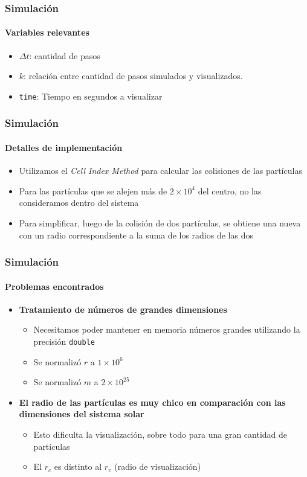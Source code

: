 \documentclass[hyperref={pdfpagelayout=SinglePage}]{beamer}
\begin{document}
\begin{frame}
\frametitle{Simulación}
\framesubtitle{Variables relevantes}
\begin{itemize}
	\item $\Delta t$: cantidad de pasos
	\item $k$: relación entre cantidad de pasos simulados y visualizados.
	\item \texttt{time}: Tiempo en segundos a visualizar
\end{itemize}
\end{frame}

\begin{frame}
\frametitle{Simulación}
\framesubtitle{Detalles de implementación}
\begin{itemize}
	\item Utilizamos el \textit{Cell Index Method} para calcular las colisiones de las partículas
	\item Para las partículas que se alejen más de $2 \times 10^{4}$ del centro, no las consideramos dentro del sistema
	\item Para simplificar, luego de la colisión de dos partículas, se obtiene una nueva con un radio correspondiente a la suma de los radios de las dos
\end{itemize}
\end{frame}

\begin{frame}
\frametitle{Simulación}
\framesubtitle{Problemas encontrados}
\begin{itemize}
	\item \textbf{Tratamiento de números de grandes dimensiones}
	\begin{itemize}
		\item Necesitamos poder mantener en memoria números grandes utilizando la precisión \texttt{double}
		\item Se normalizó $r$ a $1 \times 10^{6}$
		\item Se normalizó $m$ a $2 \times 10^{25}$
	\end{itemize}
	\item \textbf{El radio de las partículas es muy chico en comparación con las dimensiones del sistema solar}
	\begin{itemize}
			\item Esto dificulta la visualización, sobre todo para una gran cantidad de partículas
			\item El $r_{c}$ es distinto al $r_{v}$ (radio de visualización)
	\end{itemize}
\end{itemize}
\end{frame}
\end{document}
